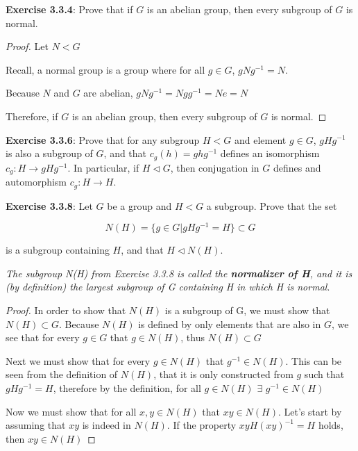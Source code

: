 \documentclass[a4paper]{article}
\begin{document}
\begin{myparindent}{0pt}
\textbf{Exercise 3.3.4}:
Prove that if $G$ is an abelian group, then every subgroup of $G$ is normal.
\newline

\begin{proof}

Let $N < G$

Recall, a normal group is a group where for all $g \in G$, $gNg^{-1} = N$.

Because $N$ and $G$ are abelian, $gNg^{-1} = Ngg^{-1} = Ne = N$

Therefore, if $G$ is an abelian group, then every subgroup of $G$ is normal.
\end{proof}

\textbf{Exercise 3.3.6}:
Prove that for any subgroup $H < G$ and element $g \in G$, $gHg^{-1}$ is also
a subgroup of $G$, and that $c_g(h) = ghg^{-1}$ defines an isomorphism
$c_g: H \rightarrow gHg^{-1}$. In particular, if $H \triangleleft G$, then
conjugation in $G$ defines and automorphism $c_g: H \rightarrow H$.
\newline

\textbf{Exercise 3.3.8}:
Let $G$ be a group and $H < G$ a subgroup. Prove that the set

\[ N(H) = \{g \in G | gHg^{-1} = H \} \subset G \]
\newline

is a subgroup containing $H$, and that $H \triangleleft N(H)$.

\textit{The subgroup N(H) from Exercise 3.3.8 is called the
\textbf{normalizer of H}, and it is (by definition) the largest subgroup of G
containing H in which H is normal}.
\newline

\begin{proof}
  In order to show that $N(H)$ is a subgroup of G, we must show that
  $N(H) \subset G$. Because $N(H)$ is defined by only elements that are also in
  $G$, we see that for every $g \in G$ that $g \in N(H)$, thus $N(H) \subset G$
  \newline

  Next we must show that for every $g \in N(H)$ that $g^{-1} \in N(H)$. This can
  be seen from the definition of $N(H)$, that it is only constructed from $g$
  such that $gHg^{-1} = H$, therefore by the definition, for all
  $g \in N(H)$ $\exists$ $g^{-1} \in N(H)$
  \newline

  Now we must show that for all $x, y \in N(H)$ that $xy \in N(H)$. Let's
  start by assuming that $xy$ is indeed in $N(H)$. If the property
  $x y H (x y)^{-1} = H$ holds, then $xy \in N(H)$


\end{proof}
\end{myparindent}
\end{document}
